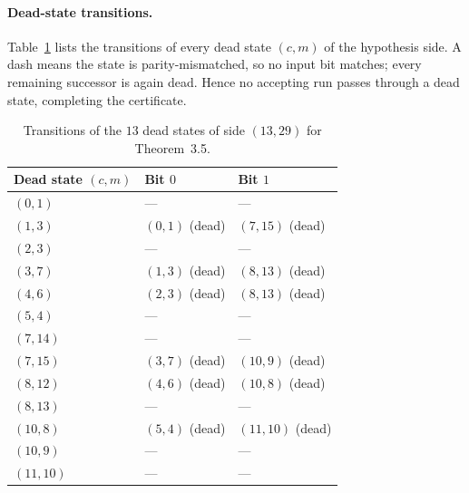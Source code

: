 \documentclass[11pt]{article}
\begin{document}
\paragraph{Dead-state transitions.}
Table~\ref{tab:app-35d} lists the transitions of every dead state $(c, m)$ of the hypothesis side. A dash means the state is parity-mismatched, so no input bit matches; every remaining successor is again dead. Hence no accepting run passes through a dead state, completing the certificate.

\begin{table}[ht]
\centering
\small
\begin{tabular}{lll}
\hline
Dead state $(c, m)$ & Bit $0$ & Bit $1$ \\
\hline
$(0,1)$ & --- & --- \\
$(1,3)$ & $(0,1)$ (dead) & $(7,15)$ (dead) \\
$(2,3)$ & --- & --- \\
$(3,7)$ & $(1,3)$ (dead) & $(8,13)$ (dead) \\
$(4,6)$ & $(2,3)$ (dead) & $(8,13)$ (dead) \\
$(5,4)$ & --- & --- \\
$(7,14)$ & --- & --- \\
$(7,15)$ & $(3,7)$ (dead) & $(10,9)$ (dead) \\
$(8,12)$ & $(4,6)$ (dead) & $(10,8)$ (dead) \\
$(8,13)$ & --- & --- \\
$(10,8)$ & $(5,4)$ (dead) & $(11,10)$ (dead) \\
$(10,9)$ & --- & --- \\
$(11,10)$ & --- & --- \\
\hline
\end{tabular}
\caption{Transitions of the $13$ dead states of side $(13,29)$ for Theorem~3.5.}
\label{tab:app-35d}
\end{table}
\end{document}
